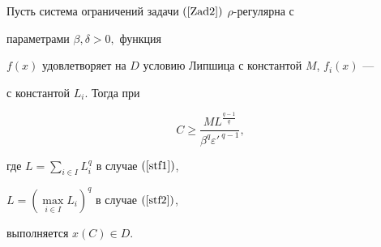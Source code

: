 \begin{thm}


Пусть система ограничений задачи $(\ref{Zad2})$ $\rho$-регулярна с


параметрами $\beta,\delta>0,$ функция


$f(x)$ удовлетворяет на $D$ условию Липшица с константой $M$, $f_{i}(x)$ ---


с константой $L_i$. Тогда при


\begin{equation}\label{eq9}


C\geq \frac{M L^{\frac{q-1}{q}}} {\beta^q {\varepsilon'\,}^{q-1} },


\end{equation}


где $L=\sum\limits_{i\in I}L_i^q$ в случае $(\ref{stf1})$,


$L=(\max\limits_{i\in I}L_i)^q$ в случае $(\ref{stf2})$,


выполняется $x(C)\in D$.


\end{thm}





